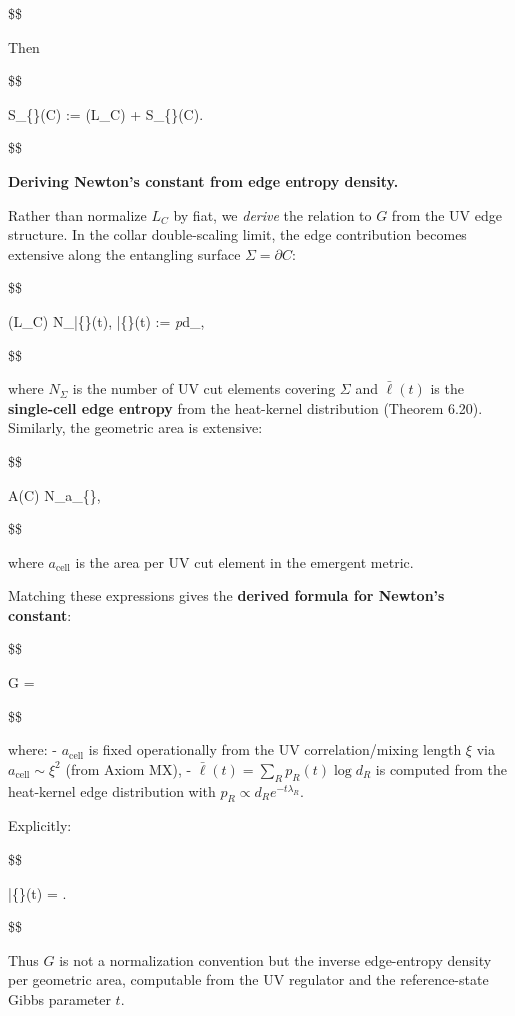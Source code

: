 \documentclass[11pt,a4paper]{article}
\theoremstyle{remark}
\begin{document}
\$\$

Then

\$\$

S\_\{\}(C) := (\rho L\_C) + S\_\{\}(C).

\$\$

\textbf{Deriving Newton's constant from edge entropy density.}

Rather than normalize \(L_C\) by fiat, we \emph{derive} the relation to \(G\) from the
UV edge structure. In the collar double-scaling limit, the edge contribution
becomes extensive along the entangling surface \(\Sigma = \partial C\):

\$\$

(\rho L\_C) \approx N\_\Sigma \cdot \bar\{\ell\}(t),
\qquad
\bar\{\ell\}(t) := \sum\emph{\alpha p}\alpha \log d\_\alpha,

\$\$

where \(N_\Sigma\) is the number of UV cut elements covering \(\Sigma\) and
\(\bar{\ell}(t)\) is the \textbf{single-cell edge entropy} from the heat-kernel
distribution (Theorem 6.20). Similarly, the geometric area is extensive:

\$\$

A(C) \approx N\_\Sigma \cdot a\_\{\},

\$\$

where \(a_{\mathrm{cell}}\) is the area per UV cut element in the emergent metric.

Matching these expressions gives the \textbf{derived formula for Newton's constant}:

\$\$

G = 

\$\$

where:
- \(a_{\mathrm{cell}}\) is fixed operationally from the UV correlation/mixing
length \(\xi\) via \(a_{\mathrm{cell}} \sim \xi^2\) (from Axiom MX),
- \(\bar{\ell}(t) = \sum_R p_R(t) \log d_R\) is computed from the heat-kernel
edge distribution with \(p_R \propto d_R e^{-t\lambda_R}\).

Explicitly:

\$\$

\bar\{\ell\}(t) = .

\$\$

Thus \(G\) is not a normalization convention but
the inverse edge-entropy density per geometric area, computable from the UV
regulator and the reference-state Gibbs parameter \(t\).
\end{document}
